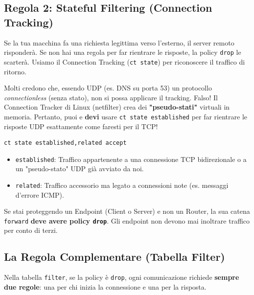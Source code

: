 \documentclass[12pt,a4paper]{report}
\begin{document}
	\subsection{Regola 2: Stateful Filtering (Connection Tracking)}
	Se la tua macchina fa una richiesta legittima verso l'esterno, il server remoto risponderà. Se non hai una regola per far rientrare le risposte, la policy \texttt{drop} le scarterà. Usiamo il Connection Tracking (\texttt{ct state}) per riconoscere il traffico di ritorno.
	
	\begin{nota}
		Molti credono che, essendo UDP (es. DNS su porta 53) un protocollo \textit{connectionless} (senza stato), non si possa applicare il tracking. Falso! Il Connection Tracker di Linux (netfilter) crea dei \textbf{"pseudo-stati"} virtuali in memoria. Pertanto, puoi e \textbf{devi} usare \texttt{ct state established} per far rientrare le risposte UDP esattamente come faresti per il TCP!
	\end{nota}
	
	\begin{lstlisting}[language=bash]
		ct state established,related accept
	\end{lstlisting}
	\begin{itemize}
		\item \texttt{established}: Traffico appartenente a una connessione TCP bidirezionale o a un "pseudo-stato" UDP già avviato da noi.
		\item \texttt{related}: Traffico accessorio ma legato a connessioni note (es. messaggi d'errore ICMP).
	\end{itemize}
	
	\begin{nota}
		Se stai proteggendo un Endpoint (Client o Server) e non un Router, la sua catena \texttt{forward} \textbf{deve avere policy \texttt{drop}}. Gli endpoint non devono mai inoltrare traffico per conto di terzi.
	\end{nota}
	
	\subsection{La Regola Complementare (Tabella Filter)}
	Nella tabella \texttt{filter}, se la policy è \texttt{drop}, ogni comunicazione richiede \textbf{sempre due regole}: una per chi inizia la connessione e una per la risposta.
	
\end{document}
